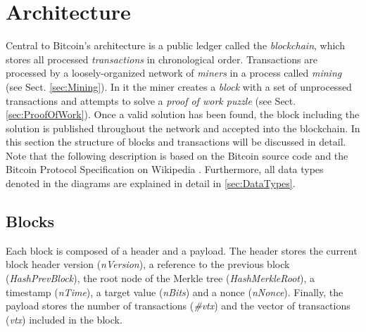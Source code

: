 \section{Architecture} \label{sec:Architecture}
Central to Bitcoin's architecture is a public ledger called the \emph{blockchain}, which stores all processed \emph{transactions} in chronological order. Transactions are processed by a loosely-organized network of \emph{miners} in a process called \emph{mining} (see Sect. \ref{sec:Mining}). In it the miner creates a \emph{block} with a set of unprocessed transactions and attempts to solve a \emph{proof of work puzzle} (see Sect. \ref{sec:ProofOfWork}). Once a valid solution has been found, the block including the solution is published throughout the network and accepted into the blockchain. In this section the structure of blocks and transactions will be discussed in detail. Note that the following description is based on the Bitcoin source code \cite{BitcoinSourceCode} and the Bitcoin Protocol Specification on Wikipedia \cite{Wikipedia_ProtocolSpec}. Furthermore, all data types denoted in the diagrams are explained in detail in \ref{sec:DataTypes}.

\subsection{Blocks} \label{sec:Blocks}
Each block is composed of a header and a payload. The header stores the current block header version (\textit{nVersion}), a reference to the previous block (\textit{HashPrevBlock}), the root node of the Merkle tree (\textit{HashMerkleRoot}), a timestamp (\textit{nTime}), a target value  (\textit{nBits}) and a nonce (\textit{nNonce}). Finally, the payload stores the number of transactions (\textit{\#vtx}) and the vector of transactions (\textit{vtx}) included in the block.

